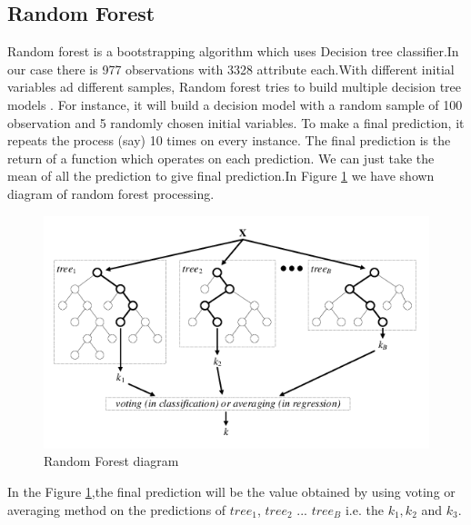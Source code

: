 \subsection{Random Forest}
Random forest is a bootstrapping algorithm which uses Decision tree classifier.In our case there is 977 observations with 3328 attribute each.With different initial variables ad different samples, Random forest tries to build multiple decision tree models . For instance, it will build a decision model with a random sample of 100 observation and 5 randomly chosen initial variables. To  make a final prediction, it repeats the process (say) 10 times on every instance. The final prediction is the return of a function which operates on each prediction. We can just take the mean of all the prediction to give final prediction.In Figure \ref{fig:random_forest} we have shown diagram of random forest processing.


\begin{figure}[ht]
    \centering
    \includegraphics[width=15cm]{Pictures/random_forest_1.png}
    \caption{Random Forest diagram \cite{randomforest} }
    \label{fig:random_forest}
\end{figure}


In the Figure \ref{fig:random_forest},the final prediction will be the value obtained by using voting or averaging method on the predictions of $tree_1$, $tree_2$ ... $tree_B$ i.e. the $k_1,k_2$ and $k_3$. 